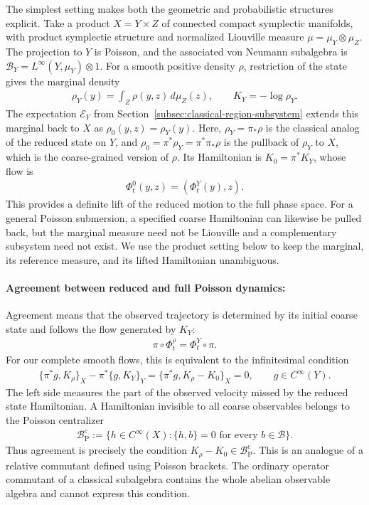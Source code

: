 \documentclass[a4paper,11pt]{article}
\theoremstyle{definition}
\newcommand{\mB}{\mathcal{B}}
\newcommand{\NL}[1]{\textcolor{blue}{#1}}
\newcommand{\mE}{\mathcal{E}}
\begin{document}
The simplest setting makes both the geometric and probabilistic structures explicit. Take a product $X=Y\times Z$ of connected compact symplectic manifolds, with product symplectic structure and normalized Liouville measure $\mu=\mu_Y\otimes\mu_Z$. The projection to $Y$ is Poisson, and the associated von Neumann subalgebra is $\mB_Y=L^\infty(Y,\mu_Y)\otimes1$. For a smooth positive density $\rho$, restriction of the state gives the marginal density
\begin{align}\label{eq:classical-marginal-Hamiltonian}
    \rho_Y(y)=\int_Z\rho(y,z)\,d\mu_Z(z),\qquad
    K_Y=-\log\rho_Y.
\end{align}
The expectation $\mE_Y$ from Section~\ref{subsec:classical-region-subsystem} extends this marginal back to $X$ as $\rho_0(y,z)=\rho_Y(y)$. Here, $\rho_Y=\pi_*\rho$ is the classical analog of the reduced state on $Y$, and $\rho_0=\pi^*\rho_Y=\pi^*\pi_* \rho$ is the pullback of $\rho_Y$ to $X$, which is the coarse-grained version of $\rho$. Its Hamiltonian is $K_0=\pi^*K_Y$, whose flow is
\begin{align}
    \Phi_t^0(y,z)=(\Phi_t^Y(y),z).
\end{align}
This provides a definite lift of the reduced motion to the full phase space. For a general Poisson submersion, a specified coarse Hamiltonian can likewise be pulled back, but the marginal measure need not be Liouville and a complementary subsystem need not exist. We use the product setting below to keep the marginal, its reference measure, and its lifted Hamiltonian unambiguous.



\paragraph{Agreement between reduced and full Poisson dynamics:}
Agreement means that the observed trajectory is determined by its initial coarse state and follows the flow generated by $K_Y$:
\begin{align}\label{eq:classical-state-intertwining}
    \pi\circ\Phi_t^\rho=\Phi_t^Y\circ\pi.
\end{align}
For our complete smooth flows, this is equivalent to the infinitesimal condition
\begin{align}\label{eq:classical-state-defect}
    \{\pi^*g,K_\rho\}_X-\pi^*\{g,K_Y\}_Y
    =\{\pi^*g,K_\rho-K_0\}_X=0,
    \qquad g\in C^\infty(Y).
\end{align}
The left side measures the part of the observed velocity missed by the reduced state Hamiltonian. A Hamiltonian invisible to all coarse observables belongs to the Poisson centralizer
\begin{align}
    \mathcal B^{\mathrm c}_{\mathrm P}
    :=\{h\in C^\infty(X):\{h,b\}=0\text{ for every }b\in\mathcal B\}.
\end{align}
Thus agreement is precisely the condition $K_\rho-K_0\in\mathcal B^{\mathrm c}_{\mathrm P}$. This is an analogue of a relative commutant defined using Poisson brackets. The ordinary operator commutant of a classical subalgebra contains the whole abelian observable algebra and cannot express this condition.
\end{document}
